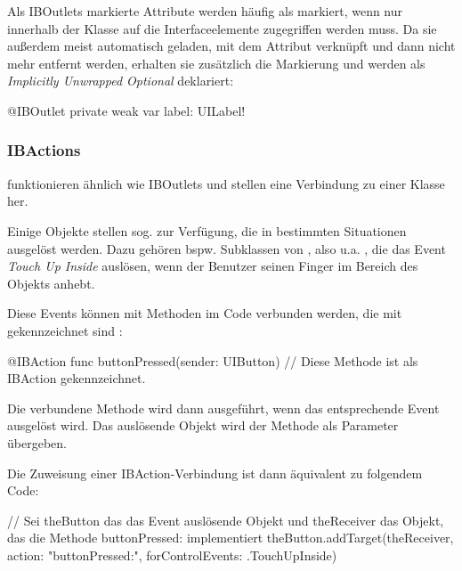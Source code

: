 \documentclass[parskip=half, final]{scrreprt}
\begin{document}
Als IBOutlets markierte Attribute werden häufig als  markiert, wenn nur innerhalb der Klasse auf die Interfaceelemente zugegriffen werden muss. Da sie außerdem meist automatisch geladen, mit dem Attribut verknüpft und dann nicht mehr entfernt werden, erhalten sie zusätzlich die Markierung  und werden als \emph{Implicitly Unwrapped Optional} deklariert:

\begin{swiftcode}
@IBOutlet private weak var label: UILabel!
\end{swiftcode}


\subsubsection{IBActions}

 funktionieren ähnlich wie IBOutlets und stellen eine Verbindung zu  einer Klasse her.

Einige Objekte stellen sog.  zur Verfügung, die in bestimmten Situationen ausgelöst werden. Dazu gehören bspw. Subklassen von , also u.a. , die das Event \emph{Touch Up Inside} auslösen, wenn der Benutzer seinen Finger im Bereich des Objekts anhebt.

Diese Events können mit Methoden im Code verbunden werden, die mit  gekennzeichnet sind :

\begin{swiftcode}
@IBAction func buttonPressed(sender: UIButton) { } // Diese Methode ist als IBAction gekennzeichnet.
\end{swiftcode}


Die verbundene Methode wird dann ausgeführt, wenn das entsprechende Event ausgelöst wird. Das auslösende Objekt wird der Methode als Parameter  übergeben.

Die Zuweisung einer IBAction-Verbindung ist dann äquivalent zu folgendem Code:

\begin{swiftcode}
// Sei theButton das das Event auslösende Objekt und theReceiver das Objekt, das die Methode buttonPressed: implementiert
theButton.addTarget(theReceiver, action: "buttonPressed:", forControlEvents: .TouchUpInside)
\end{swiftcode}
\end{document}
